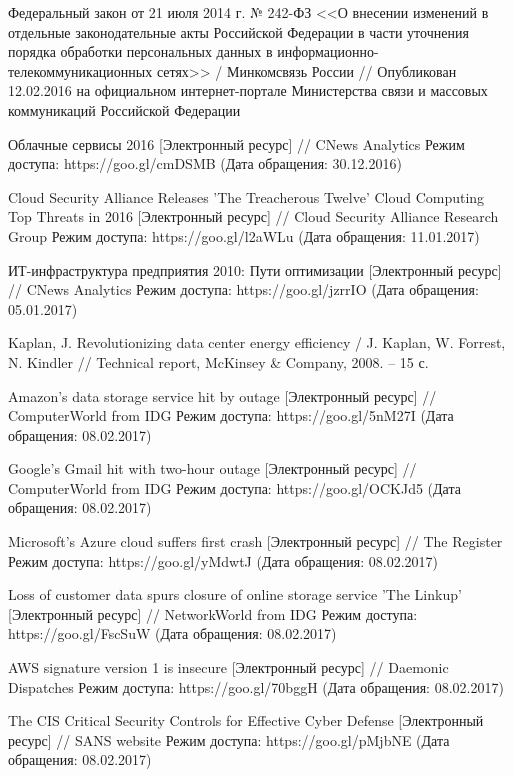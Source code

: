 \begin{thebibliography}{00}
    Федеральный закон от 21 июля 2014 г. № 242-ФЗ <<О внесении изменений в отдельные законодательные акты Российской Федерации в части уточнения порядка обработки персональных данных в информационно-телекоммуникационных сетях>> /
    Минкомсвязь России //
    Опубликован 12.02.2016 на официальном интернет-портале Министерства связи и массовых коммуникаций Российской Федерации

    Облачные сервисы 2016
    [Электронный ресурс] //
    CNews Analytics
    Режим доступа: https://goo.gl/cmDSMB
    (Дата обращения: 30.12.2016)

    Cloud Security Alliance Releases 'The Treacherous Twelve' Cloud Computing Top Threats in 2016
    [Электронный ресурс] //
    Cloud Security Alliance Research Group
    Режим доступа: https://goo.gl/l2aWLu
    (Дата обращения: 11.01.2017)

    ИТ-инфраструктура предприятия 2010: Пути оптимизации
    [Электронный ресурс] //
    CNews Analytics
    Режим доступа: https://goo.gl/jzrrIO
    (Дата обращения: 05.01.2017)

    Kaplan, J.
    Revolutionizing data center energy efficiency /
    J. Kaplan, W. Forrest, N. Kindler //
    Technical report, McKinsey \& Company, 2008. -- 15 с.

    Amazon's data storage service hit by outage
    [Электронный ресурс] //
    ComputerWorld from IDG
    Режим доступа: https://goo.gl/5nM27I
    (Дата обращения: 08.02.2017)

    Google's Gmail hit with two-hour outage
    [Электронный ресурс] //
    ComputerWorld from IDG
    Режим доступа: https://goo.gl/OCKJd5
    (Дата обращения: 08.02.2017)

    Microsoft's Azure cloud suffers first crash
    [Электронный ресурс] //
    The Register
    Режим доступа: https://goo.gl/yMdwtJ
    (Дата обращения: 08.02.2017)

    Loss of customer data spurs closure of online storage service 'The Linkup'
    [Электронный ресурс] //
    NetworkWorld from IDG
    Режим доступа: https://goo.gl/FscSuW
    (Дата обращения: 08.02.2017)

    AWS signature version 1 is insecure
    [Электронный ресурс] //
    Daemonic Dispatches
    Режим доступа: https://goo.gl/70bggH
    (Дата обращения: 08.02.2017)

    The CIS Critical Security Controls for Effective Cyber Defense
    [Электронный ресурс] //
    SANS website
    Режим доступа: https://goo.gl/pMjbNE
    (Дата обращения: 08.02.2017)


\end{thebibliography}
